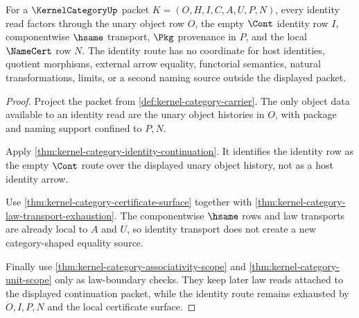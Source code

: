 \begin{theorem}
\label{thm:kernel-category-identity-cont-route-exhaustion}
For a $\KernelCategoryUp$ packet $K=(O,H,I,C,A,U,P,N)$, every identity read factors through the unary object row $O$, the empty $\Cont$ identity row $I$, componentwise $\hsame$ transport, $\Pkg$ provenance in $P$, and the local $\NameCert$ row $N$. The identity route has no coordinate for host identities, quotient morphisms, external arrow equality, functorial semantics, natural transformations, limits, or a second naming source outside the displayed packet.
\end{theorem}
\begin{proof}
Project the packet from \autoref{def:kernel-category-carrier}. The only object data available to an identity read are the unary object histories in $O$, with package and naming support confined to $P,N$.

Apply \autoref{thm:kernel-category-identity-continuation}. It identifies the identity row as the empty $\Cont$ route over the displayed unary object history, not as a host identity arrow.

Use \autoref{thm:kernel-category-certificate-surface} together with \autoref{thm:kernel-category-law-transport-exhaustion}. The componentwise $\hsame$ rows and law transports are already local to $A$ and $U$, so identity transport does not create a new category-shaped equality source.

Finally use \autoref{thm:kernel-category-associativity-scope} and \autoref{thm:kernel-category-unit-scope} only as law-boundary checks. They keep later law reads attached to the displayed continuation packet, while the identity route remains exhausted by $O,I,P,N$ and the local certificate surface.
\end{proof}

